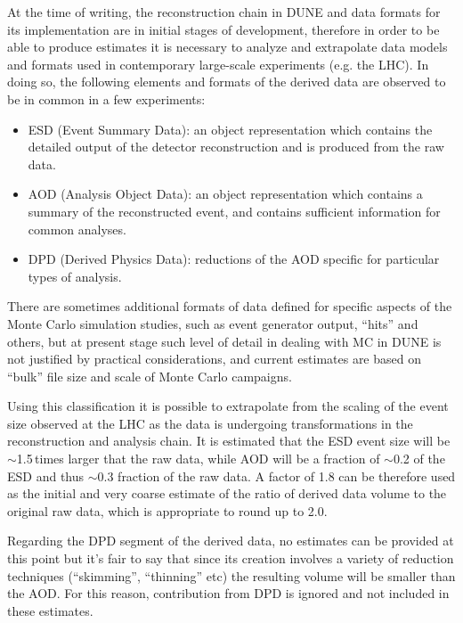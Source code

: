 At the time of writing, the reconstruction chain in DUNE and data formats for its implementation are in initial
stages of development, therefore in order to be able to produce estimates it is necessary to analyze and extrapolate
data models and formats used in contemporary large-scale experiments (e.g. the LHC). In doing so, the following elements
and formats of the derived data are observed to be in common in a few experiments:

\begin{itemize}

\item ESD (Event Summary Data): an object representation which contains the detailed output of the detector reconstruction and is
produced from the raw data.

\item AOD (Analysis Object Data): an object representation which contains a summary of the reconstructed event,
and contains sufficient information for common analyses.

\item DPD (Derived Physics Data): reductions of the AOD specific for particular types of analysis.

\end{itemize}

\noindent
There are sometimes additional formats of data defined for specific aspects of the Monte Carlo simulation studies, such as
event generator output, ``hits'' and others, but at present stage such level of detail in dealing with MC in DUNE is not
justified by practical considerations, and current estimates are based on ``bulk'' file size and scale of Monte Carlo campaigns.

Using this classification it is possible to extrapolate from the scaling of the event size observed at the LHC as the data
is undergoing transformations in the reconstruction and analysis chain. It is estimated that the ESD event size will be
$\sim$1.5\,times larger that the raw data, while AOD will be a fraction of $\sim$0.2 of the ESD and thus $\sim$0.3 fraction
of the raw data.
A factor of 1.8 can be therefore used as the initial and very coarse estimate of the ratio of derived data volume to
the original raw data, which is appropriate to round up to 2.0.

Regarding the DPD segment of the derived data, no estimates can be provided at this point but it's fair to say that since
its creation involves a variety of reduction techniques (``skimming'', ``thinning'' etc) the resulting volume will be smaller than
the AOD. For this reason, contribution from DPD is ignored and not included in these estimates.

